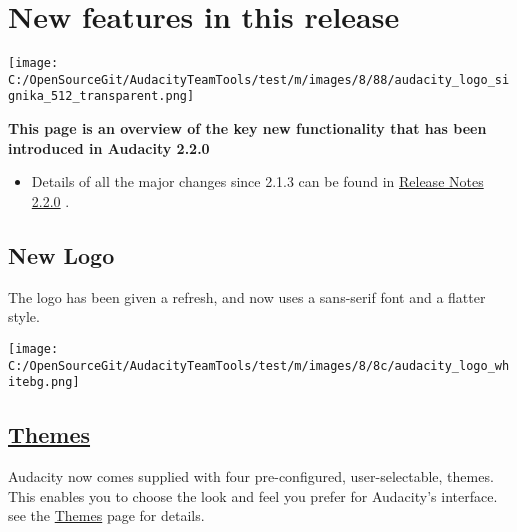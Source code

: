 
\chapter{New features in this release}\begin{multicols}{2}\par \texttt{[image: C:/OpenSourceGit/AudacityTeamTools/test/m/images/8/88/audacity\_logo\_signika\_512\_transparent.png]}\par \textbf{This page is an overview of the key new functionality that has been introduced in Audacity 2.2.0}
\begin{itemize}
\item Details of all the major changes since 2.1.3 can be found in 
\hyperref[https:__wiki.audacityteam.org_wiki_Release_Notes_2.2.0]{Release Notes 2.2.0}
.
\end{itemize}

\section{New Logo}The logo has been given a refresh, and now uses a sans-serif font and a flatter style.
\par \texttt{[image: C:/OpenSourceGit/AudacityTeamTools/test/m/images/8/8c/audacity\_logo\_whitebg.png]}\par 
\section{
\hyperref[themes_]{Themes}
}Audacity now comes supplied with four pre-configured, user-selectable, themes.  This enables you to choose the look and feel you prefer for Audacity's interface. see the 
\hyperref[themes_]{Themes}
 page for details.


\end{multicols}
